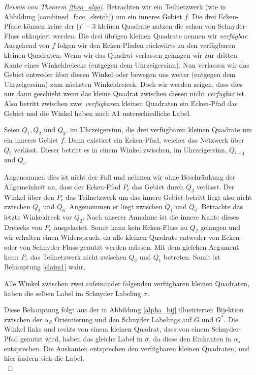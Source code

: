 \begin{proof}[Beweis von Theorem \ref{theo_algo}]
Betrachten wir ein Teilnetzwerk (wie in Abbildung \ref{combined_face_sketch}) um ein inneres Gebiet $f$. Die drei Ecken-Pfade können keine der $|f|-3$ kleinen Quadrate nutzen die schon von Schnyder-Fluss okkupiert werden. Die drei übrigen kleinen Quadrate nennen wir \textit{verfügbar}. Ausgehend von $f$ folgen wir den Ecken-Pfaden rückwärts zu den verfügbaren kleinen Quadraten. Wenn wir das Quadrat verlassen gelangen wir zur dritten Kante eines Winkeldreiecks (entgegen dem Uhrzeigersinn). Nun verlassen wir das Gebiet entweder über diesen Winkel oder bewegen uns weiter (entgegen dem Uhrzeigersinn) zum nächsten Winkeldreieck. Doch wir werden zeigen, dass dies nur dann geschieht wenn das kleine Quadrat zwischen diesen nicht \textit{verfügbar} ist. Also betritt zwischen zwei \textit{verfügbaren} kleinen Quadraten ein Ecken-Pfad das Gebiet und die Winkel haben nach A1 unterschiedliche Label.

\begin{claim}\label{claim1}
Seien $Q_1,Q_2$ und $Q_3$, im Uhrzeigersinn, die drei verfügbaren kleinen Quadrate um ein inneres Gebiet $f$. Dann existiert ein Ecken-Pfad, welcher das Netzwerk über $Q_i$ verlässt. Dieser betritt es in einem Winkel zwischen, im Uhrzeigersinn, $Q_{i-1}$ und $Q_i$.
\end{claim}

Angenommen dies ist nicht der Fall und nehmen wir ohne Beschränkung der Allgemeinheit an, dass der Ecken-Pfad $P_e$ das Gebiet durch $Q_3$ verlässt. Der Winkel über den $P_e$ das Teilnetzwerk um das innere Gebiet betritt liegt also nicht zwischen $Q_2$ und $Q_3$. Angenommen er liegt zwischen $Q_1$ und $Q_2$. Betrachte das letzte Winkeldreck vor $Q_2$. Nach unserer Annahme ist die innere Kante dieses Dreiecks von $P_e$ ausgelastet. Somit kann kein Ecken-Fluss zu $Q_2$ gelangen und wir erhalten einen Widerspruch, da alle kleinen Quadrate entweder von Ecken- oder von Schnyder-Fluss genutzt werden müssen. Mit dem gleichen Argument kann $P_e$ das Teilnetzwerk nicht zwischen $Q_3$ und $Q_1$ betreten. Somit ist Behauptung \ref{claim1} wahr.

\begin{claim}
Alle Winkel zwischen zwei aufeinander folgenden verfügbaren kleinen Quadraten, haben die selben Label im Schnyder Labeling $\sigma$.
\end{claim}
Diese Behauptung folgt aus der in Abbildung \ref{alpha_bij} illustrierten Bijektion zwischen der $\alpha_S$ Orientierung und den Schnyder Labelings auf $G$ und $G^*$. Die Winkel links und rechts von einem kleinen Quadrat, dass von einem Schnyder-Pfad genutzt wird, haben das gleiche Label in $\sigma$, da diese den Einkanten in $\alpha_s$ entsprechen. Die Auskanten entsprechen den verfügbaren kleinen Quadraten, und hier ändern sich die Label.\\


\end{proof}
